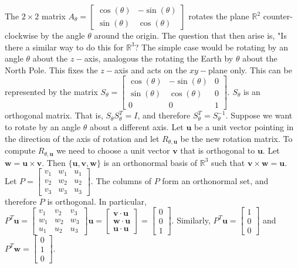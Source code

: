 \documentclass[oneside]{book}
\theoremstyle{definition}
\newcommand*\B[1]{\mathbf{#1}}
\begin{document}
The $2\times 2$ matrix $A_{\theta} = \begin{bmatrix} \cos(\theta) & -\sin(\theta) \\ \sin(\theta) & \cos(\theta)\end{bmatrix}$ rotates the plane $\mathbb{R}^2$ counter-clockwise by the angle $\theta$ around the origin. The question that then arise is, "Is there a similar way to do this for $\mathbb{R}^3$? The simple case would be rotating by an angle $\theta$ about the $z-$axis, analogous the rotating the Earth by $\theta$ about the North Pole. This fixes the $z-$axis and acts on the $xy-$plane only. This can be represented by the matrix $S_{\theta} = \begin{bmatrix} \cos(\theta) & -\sin(\theta) & 0 \\ \sin(\theta) & \cos(\theta) & 0 \\ 0 & 0 & 1 \end{bmatrix}$. $S_{\theta}$ is an orthogonal matrix. That is, $S_{\theta} S_{\theta}^T = I$, and therefore $S_{\theta}^T = S_{\theta}^{-1}$. Suppose we want to rotate by an angle $\theta$ about a different axis. Let $\B{u}$ be a unit vector pointing in the direction of the axis of rotation and let $R_{\theta,\B{u}}$ be the new rotation matrix. To compute $R_{\theta,\B{u}}$ we need to choose a unit vector $\B{v}$ that is orthogonal to $\B{u}$. Let $\B{w} = \B{u}\times \B{v}$. Then $\{\B{u},\B{v},\B{w}\}$ is an orthonormal basis of $\mathbb{R}^3$ such that $\B{v}\times \B{w} = \B{u}$. Let $P = \begin{bmatrix} v_1 & w_1 & u_1 \\ v_2 & w_2 & u_2 \\ v_3 & w_3 & u_3 \end{bmatrix}$. The columns of $P$ form an orthonormal set, and therefore $P$ is orthogonal. In particular, $P^T\B{u} = \begin{bmatrix} v_1 & v_2 & v_3 \\ w_1 & w_2 & w_3 \\ u_1 & u_2 & u_3 \end{bmatrix}\B{u} = \begin{bmatrix} \B{v}\cdot \B{u} \\ \B{w} \cdot \B{u} \\ \B{u} \cdot \B{u}\end{bmatrix} = \begin{bmatrix} 0 \\ 0 \\ 1 \end{bmatrix}$. Similarly, $P^T \B{u} = \begin{bmatrix} 1 \\ 0 \\ 0 \end{bmatrix}$ and $P^T \B{w} = \begin{bmatrix} 0 \\ 1 \\ 0 \end{bmatrix}$.
\end{document}
